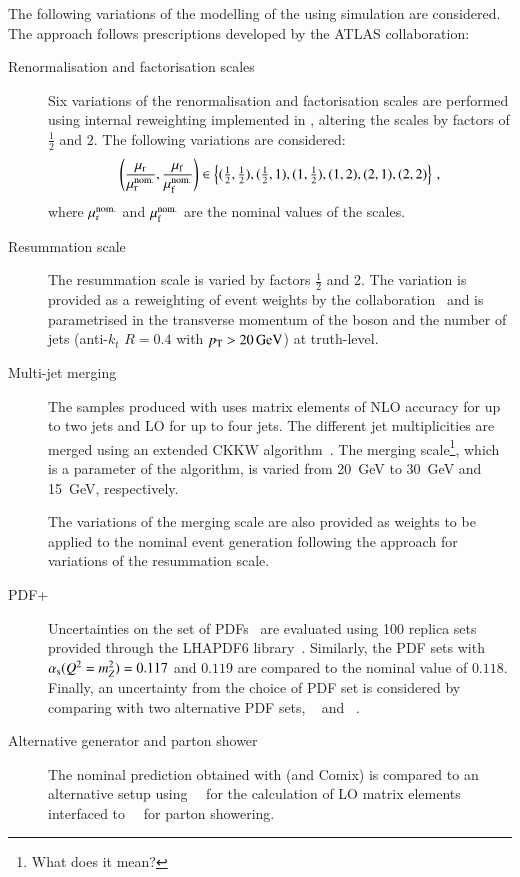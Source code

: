 The following variations of the modelling of the \ZHF using simulation
are considered. The approach follows prescriptions developed by the
ATLAS collaboration:
\begin{description}
\item[Renormalisation and factorisation scales] Six variations of the
  renormalisation and factorisation scales are performed using
  internal reweighting implemented in \SHERPA[2.2.1], altering the
  scales by factors of $\frac{1}{2}$ and $2$. The following variations
  are considered:
  \begin{align*}
    \left( \frac{\mu_\mathrm{r}}{\mu_\mathrm{r}^{\text{nom.}}}, \frac{\mu_\mathrm{f}}{\mu_\mathrm{f}^{\text{nom.}}} \right) \in
    \left\{ (\tfrac{1}{2}, \tfrac{1}{2}), (\tfrac{1}{2}, 1), (1, \tfrac{1}{2}), (1, 2), (2, 1), (2, 2) \right\} \,\text{,}
  \end{align*}
  where $\mu_\mathrm{r}^{\text{nom.}}$ and $\mu_\mathrm{f}^{\text{nom.}}$ are the nominal
  values of the scales.

\item[Resummation scale] The resummation scale 
  is varied by factors $\frac{1}{2}$ and 2. The variation is provided
  as a reweighting of event weights by the
  collaboration~\cite{anders:2017} and is parametrised in the
  transverse momentum of the \PZ boson and the number of jets
  (anti-$k_{t}$ $R = 0.4$ with $\pT > \SI{20}{\GeV}$) at truth-level.

\item[Multi-jet merging] The \Vjets samples produced with
  \SHERPA[2.2.1] uses matrix elements of NLO accuracy for up to two
  jets and LO for up to four jets. The different jet multiplicities
  are merged using an extended CKKW
  algorithm~\cite{Catani:2001cc,Hoeche:2009rj}. The merging
  scale\footnote{What does it mean?}, which is a parameter of the
  algorithm, is varied from \SI{20}{\GeV} to \SI{30}{\GeV} and
  \SI{15}{\GeV}, respectively.

  The variations of the merging scale are also provided as weights to
  be applied to the nominal event generation following the approach
  for variations of the resummation scale.

\item[PDF+\alphas] Uncertainties on the \NNPDF[3.0nnlo] set of
  PDFs~\cite{Ball:2014uwa} are evaluated using 100 replica sets
  provided through the \textsc{LHAPDF6}
  library~\cite{Buckley:2014ana}. Similarly, the \NNPDF[3.0nnlo] PDF
  sets with $\alpha_{\text{s}}(Q^2=m_{Z}^2) = 0.117$ and $0.119$ are compared to
  the nominal value of $0.118$. Finally, an uncertainty from the
  choice of PDF set is considered by comparing with two alternative
  PDF sets, \MMHT[nnlo68cl]~\cite{Harland-Lang:2014zoa} and
  \CT[14nnlo]~\cite{Dulat:2015mca}.

\item[Alternative generator and parton shower] The nominal prediction
  obtained with \SHERPA[2.2.1] (\OPENLOOPS and Comix) is compared to
  an alternative setup using~\MGNLO[2.2.2]~\cite{Alwall:2014hca} for
  the calculation of LO matrix elements interfaced
  to~\PYTHIA[8.186]~\cite{Sjostrand:2007gs} for parton showering.

\end{description}


